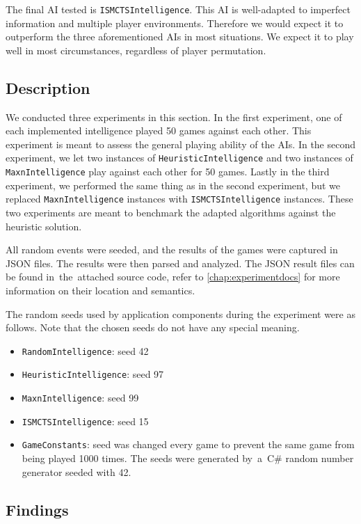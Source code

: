 The final AI tested is \texttt{ISMCTSIntelligence}. This AI is well-adapted to
imperfect information and multiple player environments. Therefore we would expect
it to outperform the three aforementioned AIs in most situations. We expect it
to play well in most circumstances, regardless of player permutation.

\subsection{Description}

We conducted three experiments in this section. In the first experiment, one of each
implemented intelligence played 50 games against each other. This experiment is meant
to assess the general playing ability of the AIs. In the second experiment, we
let two instances of \texttt{HeuristicIntelligence} and two instances of
\texttt{MaxnIntelligence} play against each other for 50 games.
Lastly in the third experiment, we performed the same thing as in the second experiment,
but we replaced \texttt{MaxnIntelligence} instances with \texttt{ISMCTSIntelligence}
instances. These two experiments are meant to benchmark the adapted algorithms
against the heuristic solution.

All random events were seeded, and the results of the games were captured in JSON
files.
The results were then parsed and analyzed. The JSON result files can be found
in~the~attached source code, refer to \autoref{chap:experimentdocs} for more information
on their location and semantics.

The random seeds used by application components during the experiment were as follows.
Note that the chosen seeds do not have any special meaning.
\begin{itemize}
    \item \texttt{RandomIntelligence}: seed 42
    \item \texttt{HeuristicIntelligence}: seed 97
    \item \texttt{MaxnIntelligence}: seed 99
    \item \texttt{ISMCTSIntelligence}: seed 15
    \item \texttt{GameConstants}: seed was changed every game to prevent the same game from
        being played 1000 times. The seeds were generated by~a~C\# 
        random number generator seeded with 42.
\end{itemize}

\clearpage
\subsection{Findings}

